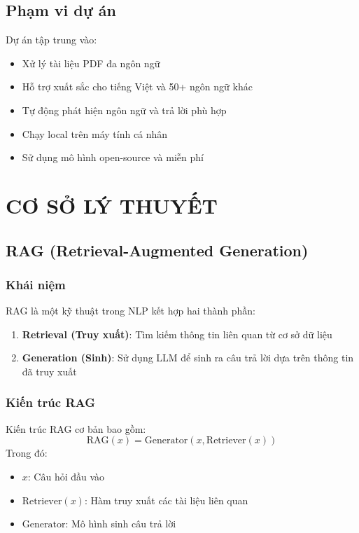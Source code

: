 \documentclass[12pt,a4paper]{report}
\begin{document}
\section{Phạm vi dự án}

Dự án tập trung vào:
\begin{itemize}
    \item Xử lý tài liệu PDF đa ngôn ngữ
    \item Hỗ trợ xuất sắc cho tiếng Việt và 50+ ngôn ngữ khác
    \item Tự động phát hiện ngôn ngữ và trả lời phù hợp
    \item Chạy local trên máy tính cá nhân
    \item Sử dụng mô hình open-source và miễn phí
\end{itemize}

\newpage

\chapter{CƠ SỞ LÝ THUYẾT}

\section{RAG (Retrieval-Augmented Generation)}

\subsection{Khái niệm}

RAG là một kỹ thuật trong NLP kết hợp hai thành phần:
\begin{enumerate}
    \item \textbf{Retrieval (Truy xuất)}: Tìm kiếm thông tin liên quan từ cơ sở dữ liệu
    \item \textbf{Generation (Sinh)}: Sử dụng LLM để sinh ra câu trả lời dựa trên thông tin đã truy xuất
\end{enumerate}

\subsection{Kiến trúc RAG}

Kiến trúc RAG cơ bản bao gồm:
\[
\text{RAG}(x) = \text{Generator}(x, \text{Retriever}(x))
\]
Trong đó:
\begin{itemize}
    \item $x$: Câu hỏi đầu vào
    \item $\text{Retriever}(x)$: Hàm truy xuất các tài liệu liên quan
    \item $\text{Generator}$: Mô hình sinh câu trả lời
\end{itemize}
\end{document}
